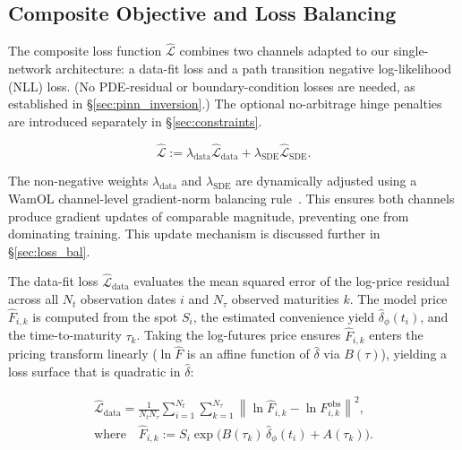 \documentclass[sigconf, authorversion=true, nonacm=true]{acmart}
\begin{document}
\subsection{Composite Objective and Loss Balancing}
\label{sec:multi_obj}

The composite loss function $\hat{\mathcal{L}}$ combines two channels adapted to our single-network architecture: a data-fit loss and a path transition negative log-likelihood (NLL) loss. (No PDE-residual or boundary-condition losses are needed, as established in \S\ref{sec:pinn_inversion}.) The optional no-arbitrage hinge penalties are introduced separately in \S\ref{sec:constraints}.

\begin{equation}
\hat{\mathcal{L}} :=
\lambda_{\text{data}} \hat{\mathcal{L}}_{\text{data}}
+ \lambda_{\text{SDE}} \hat{\mathcal{L}}_{\text{SDE}}.
\label{eq:composite}
\end{equation}

The non-negative weights $\lambda_{\text{data}}$ and $\lambda_{\text{SDE}}$ are dynamically adjusted using a WamOL channel-level gradient-norm balancing rule~\cite{Hoshisashi2024Physics-InformedPDEs}. This ensures both channels produce gradient updates of comparable magnitude, preventing one from dominating training. This update mechanism is discussed further in \S\ref{sec:loss_bal}.

The data-fit loss $\hat{\mathcal{L}}_{\text{data}}$ evaluates the mean squared error of the log-price residual across all $N_t$ observation dates $i$ and $N_\tau$ observed maturities $k$. The model price $\hat{F}_{i,k}$ is computed from the spot $S_i$, the estimated convenience yield $\hat{\delta}_\phi(t_i)$, and the time-to-maturity $\tau_k$. Taking the log-futures price ensures $\hat{F}_{i,k}$ enters the pricing transform linearly ($\ln\hat{F}$ is an affine function of $\hat{\delta}$ via $B(\tau)$), yielding a loss surface that is quadratic in $\hat{\delta}$:

\begin{equation}
\begin{gathered}
    \hat{\mathcal{L}}_{\text{data}} = \frac{1}{N_t N_\tau} \sum_{i=1}^{N_t} \sum_{k=1}^{N_\tau} \left\lVert \ln \hat{F}_{i,k} - \ln F^{\text{obs}}_{i,k} \right\rVert^2, \\
    \text{where} \quad \hat{F}_{i,k} := S_i \exp\!\big( B(\tau_k)\,\hat{\delta}_\phi(t_i) + A(\tau_k) \big).
\end{gathered}
    \label{eq:data-loss}
\end{equation}
\end{document}
